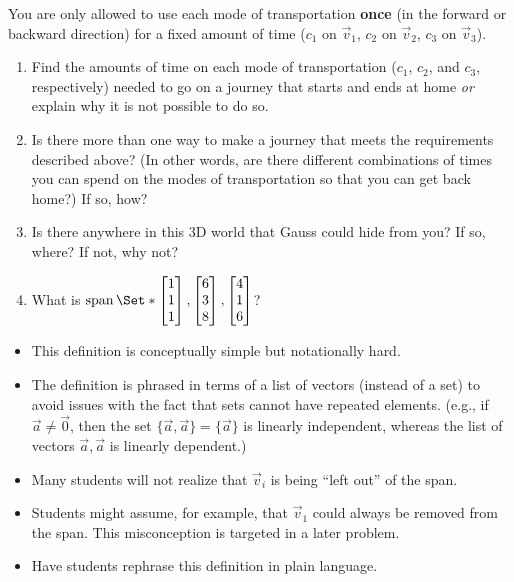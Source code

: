 \documentclass{problemset}
\begin{document}
\begin{iola}
You are only allowed to use each mode of transportation \textbf{once}
(in the forward or backward direction) for a fixed amount of time ($c_1$
on $\vec v_1$, $c_2$ on $\vec v_2$, $c_3$ on $\vec v_3$).

\vspace{5mm}


\begin{enumerate}
	\item  Find the amounts of time on each mode of transportation ($c_1$, $c_2$,
		and $c_3$, respectively) needed to go on a journey that starts and ends
		at home \emph{or} explain why it is not possible to do so.

	\item Is there more than one way to make a journey that meets the
		requirements described above? (In other words, are there different
		combinations of times you can spend on the modes of transportation so
		that you can get back home?) If so, how?

	\item Is there anywhere in this 3D world that Gauss
		could hide from you? If so, where? If not, why not?

	\item What is $\Span\Set*{\mat{1\\1\\1},\mat{6\\3\\8},\mat{4\\1\\6}}$?

\end{enumerate}
\end{iola}


	\begin{annotation}
		\begin{goals}
		\end{goals}

		\begin{notes}
			\begin{itemize}
				\item This definition is conceptually simple but notationally hard.
				\item The definition is phrased in terms of a list of vectors (instead of
					a set) to avoid issues with the fact that sets cannot have repeated elements. (e.g.,
					if $\vec a\neq \vec 0$, then the set $\{\vec a,\vec a\}=\{\vec a\}$ is linearly
					independent, whereas the list of vectors $\vec a,\vec a$ is linearly dependent.)
				\item Many students will not realize that $\vec v_i$ is being ``left out''
					of the span.
				\item Students might assume, for example, that $\vec v_1$ could always be removed
					from the span. This misconception is targeted in a later problem.
				\item Have students rephrase this definition in plain language.
			\end{itemize}
		\end{notes}
	\end{annotation}
\end{document}
